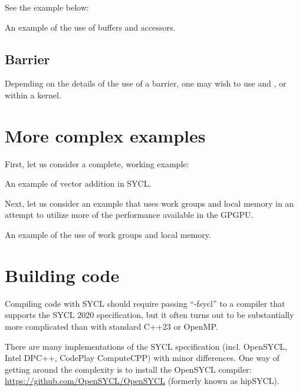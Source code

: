 See the example below:
\raggedbottom
\begin{codebox}[]{\href{https://godbolt.org/z/h1qqdbeMd}{\ExternalLink}}
\footnotesize An example of the use of buffers and accessors.
\tcblower
{}
\end{codebox}

\subsection{Barrier}

Depending on the details of the use of a barrier, one may wish to use  and , or  within a kernel.


\section{More complex examples}

First, let us consider a complete, working example:

\raggedbottom
\begin{codebox}[]{\href{https://godbolt.org/z/cPqE9PM6T}{\ExternalLink}}
\footnotesize An example of vector addition in SYCL.
\tcblower
{}
\end{codebox}

Next, let us consider an example that uses work groups and local memory in an attempt to utilize more of the performance available in the GPGPU. 

\raggedbottom
\begin{codebox}[]{\href{https://godbolt.org/z/4cvGY1sE9}{\ExternalLink}}
\footnotesize An example of the use of work groups and local memory.
\tcblower
{}
\end{codebox}
         
\section{Building code}

Compiling code with SYCL should require passing ``-fsycl'' to a compiler that supports the SYCL 2020 specification, 
but it often turns out to be substantially more complicated than with standard C++23 or OpenMP.

There are many implementations of the SYCL specification (incl. OpenSYCL, Intel DPC++, CodePlay ComputeCPP)
with minor differences. 
One way of getting around the complexity is to install the OpenSYCL compiler:
\url{https://github.com/OpenSYCL/OpenSYCL} (formerly known as hipSYCL).  

